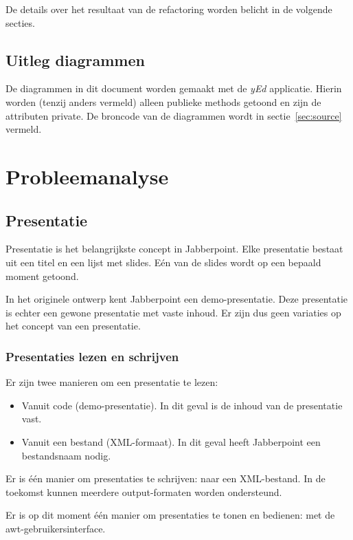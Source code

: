 \documentclass[a4paper]{article}
\begin{document}
	De details over het resultaat van de refactoring worden belicht in de volgende secties.

	\subsection*{Uitleg diagrammen}
		De diagrammen in dit document worden gemaakt met de \textit{yEd} applicatie.
		Hierin worden (tenzij anders vermeld) alleen publieke methods getoond en zijn de attributen private.
		De broncode van de diagrammen wordt in sectie~\ref{sec:source} vermeld.
	
\pagebreak
\section{Probleemanalyse}
    \label{sec:probleemanalyse}

	\subsection{Presentatie}\label{sec:presentatie-analyse}
		Presentatie is het belangrijkste concept in Jabberpoint.
		Elke presentatie bestaat uit een titel en een lijst met slides.
		Eén van de slides wordt op een bepaald moment getoond.

		In het originele ontwerp kent Jabberpoint een demo-presentatie.
		Deze presentatie is echter een gewone presentatie met vaste inhoud.
		Er zijn dus geen variaties op het concept van een presentatie.

		\subsubsection{Presentaties lezen en schrijven}
			Er zijn twee manieren om een presentatie te lezen:
			\begin{itemize}
				\item Vanuit code (demo-presentatie).
					In dit geval is de inhoud van de presentatie vast.
				\item Vanuit een bestand (XML-formaat).
					In dit geval heeft Jabberpoint een bestandsnaam nodig.
			\end{itemize}

			Er is één manier om presentaties te schrijven: naar een XML-bestand.
			In de toekomst kunnen meerdere output-formaten worden ondersteund.

			Er is op dit moment één manier om presentaties te tonen en bedienen: met de awt-gebruikersinterface.
\end{document}
